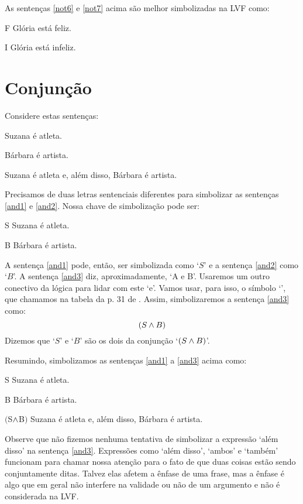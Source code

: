 As sentenças \ref{not6} e \ref{not7} acima são melhor simbolizadas na LVF como:
	\begin{ekey}
		\item[F] Glória está feliz.
		\item[I] Glória está infeliz.
	\end{ekey}

\section{Conjunção}
\label{s:ConnectiveConjunction}

Considere estas sentenças:
	\begin{earg}
		\item[\ex{and1}]Suzana é atleta.
		\item[\ex{and2}]Bárbara é artista.
		\item[\ex{and3}]Suzana é atleta e, além disso, Bárbara é artista.
	\end{earg}
Precisamos de duas letras sentenciais diferentes para simbolizar as sentenças \ref{and1} e \ref{and2}.
Nossa chave de simbolização pode ser:
	\begin{ekey}
		\item[S] Suzana é atleta.
		\item[B] Bárbara é artista.
	\end{ekey}
A sentença \ref{and1} pode, então, ser simbolizada como `$S$' e a sentença \ref{and2} como `$B$'.
A sentença \ref{and3} diz, aproximadamente, `A e B'.
Usaremos um outro conectivo da lógica para lidar com este `e'.
Vamos usar, para isso, o símbolo `\eand', que chamamos na tabela da p. 31 de .
Assim, simbolizaremos a sentença \ref{and3} como:
$$(S \wedge B)$$
Dizemos que `$S$' e `$B$' são os dois  da conjunção `$(S \wedge B)$'.

Resumindo, simbolizamos as sentenças  \ref{and1} a \ref{and3} acima como:
	\begin{ekey}
		\item[S]Suzana é atleta.
		\item[B]Bárbara é artista.
		\item[$($S$\wedge$B$)$]Suzana é atleta e, além disso, Bárbara é artista.
	\end{ekey}
Observe que não fizemos nenhuma tentativa de simbolizar a expressão `além disso' na sentença \ref{and3}.
Expressões como `além disso', `ambos' e `também' funcionam para chamar nossa atenção para o fato de que duas coisas estão sendo conjuntamente ditas.
Talvez elas afetem a ênfase de uma frase, mas a ênfase é algo que em geral não interfere na validade ou não de um argumento e não é considerada na LVF.

